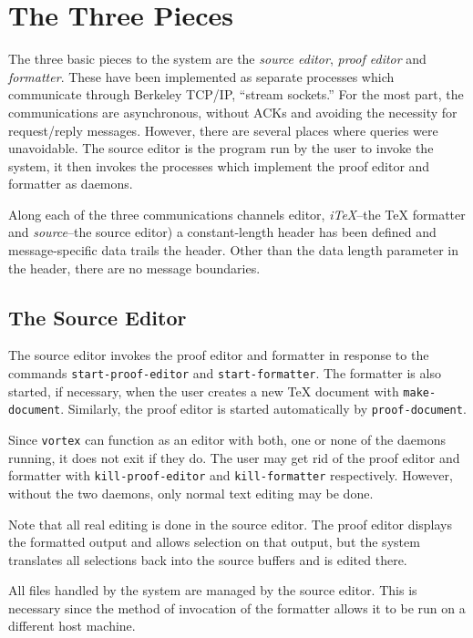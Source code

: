 \section{The Three Pieces}

The three basic pieces to the {\VorTeX} system are the {\it source
editor}, {\it proof editor} and {\it formatter}.  These have been
implemented as separate processes which communicate through Berkeley
{\UNIX} TCP/IP, ``stream sockets.'' For
the most part, the communications are asynchronous, without ACKs and
avoiding the necessity for request/reply messages.  However, there are
several places where queries were unavoidable.  The source editor is
the program run by the user to invoke the system, it then invokes the
processes which implement the proof editor and formatter as daemons.

Along each of the three communications channels editor,
{\it i\TeX}--the {\TeX} formatter and {\it source}--the source editor)
a constant-length header has been defined and message-specific data
trails the header.  Other than the data length parameter in the
header, there are no message boundaries.

\medskip
\centerline{}

\subsection{The Source Editor}

The source editor invokes the proof editor and formatter in response to
the commands {\tt start-proof-editor} and {\tt start-formatter}.
The formatter is also started, if necessary, when the user creates a new
{\TeX} document with {\tt make-document}.  Similarly, the proof editor
is started automatically by {\tt proof-document}.

Since {\tt vortex} can function as an editor with both, one or none of
the daemons running, it does not exit if they do.  The user may get rid
of the proof editor and formatter with {\tt kill-proof-editor} and
{\tt kill-formatter} respectively.  However, without the two daemons,
only normal text editing may be done.

Note that all real editing is done in the source editor.  The proof
editor displays the formatted output and allows selection on that
output, but the system translates all selections back into the source
buffers and is edited there.

All files handled by the system are managed by the source editor.
This is necessary since the method of invocation of the formatter
allows it to be run on a different host machine.

